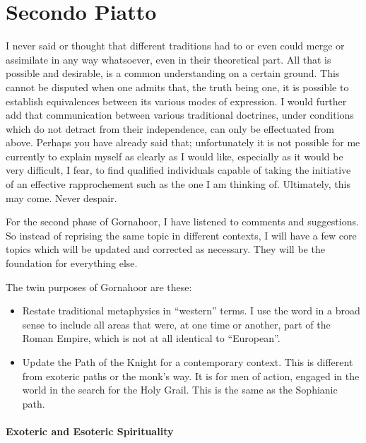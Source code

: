 \section{Secondo Piatto}

\begin{quotex}
I never said or thought that different traditions had to or even could merge or assimilate in any way whatsoever, even in their theoretical part. All that is possible and desirable, is a common understanding on a certain ground. This cannot be disputed when one admits that, the truth being one, it is possible to establish equivalences between its various modes of expression. I would further add that communication between various traditional doctrines, under conditions which do not detract from their independence, can only be effectuated from above. Perhaps you have already said that; unfortunately it is not possible for me currently to explain myself as clearly as I would like, especially as it would be very difficult, I fear, to find qualified individuals capable of taking the initiative of an effective rapprochement such as the one I am thinking of. Ultimately, this may come. Never despair.
\end{quotex}


For the second phase of Gornahoor, I have listened to comments and suggestions. So instead of reprising the same topic in different contexts, I will have a few core topics which will be updated and corrected as necessary. They will be the foundation for everything else.

The twin purposes of Gornahoor are these:

\begin{itemize}


\item Restate traditional metaphysics in ``western'' terms. I use the word in a broad sense to include all areas that were, at one time or another, part of the Roman Empire, which is not at all identical to ``European''.

\item Update the Path of the Knight for a contemporary context. This is different from exoteric paths or the monk's way. It is for men of action, engaged in the world in the search for the Holy Grail. This is the same as the Sophianic path.
\end{itemize}


\paragraph{Exoteric and Esoteric Spirituality}


